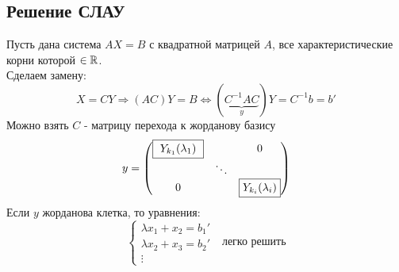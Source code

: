     \subsection{Решение СЛАУ}
    Пусть дана система $AX = B$ с квадратной матрицей $A$, все характеристические корни которой $\in \mathbb{R}$.\\
    Сделаем замену: 
    $$X = CY \Longrightarrow (AC)Y = B \Longleftrightarrow (\underbrace{C^{-1}AC}_{y} )Y = C^{-1}b=b'$$
    Можно взять $C$ - матрицу перехода к жорданову базису
    $$y = \begin{pmatrix}
        \text{\fbox{ $Y_{k_1}(\lambda_1)$ }} & \null & 0\\
        \null & \ddots \\
        0 & \null & \text{\fbox{$Y_{k_i}(\lambda_i)$}}
    \end{pmatrix}$$
    Если $y$ жорданова клетка, то уравнения:
    $$\begin{cases}
        \lambda x_1 + x_2 = b_1'\\
        \lambda x_2 + x_3 = b_2'\\
        \vdots
    \end{cases} \ \ \ \text{легко решить}$$
